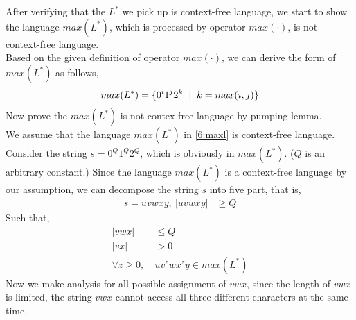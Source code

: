 \documentclass[11pt,a4paper]{article}
\newcommand{\htab}{\hspace*{0.63cm}}
\newcommand{\ba}{\hspace*{0.2cm} | \hspace*{0.2cm}}
\newcommand{\LL}{L^{*}}
\begin{document}
\htab After verifying that the $\LL$ we pick up is context-free language, we start to
show the language $max(\LL)$, which is processed by operator $max(\cdot)$,
is not context-free language. \\
\htab Based on the given definition of operator $max(\cdot)$, we can derive 
the form of $max(\LL)$ as follows,
\begin{align}
    max(\LL) = \{ 0^{i}1^{j}2^{k} \ba k = max(i,j) \} \label{6:maxl}
    \end{align}
\htab Now prove the $max(\LL)$ is not contex-free language by pumping lemma. \\
\htab We assume that the language $max(\LL)$ in \eqref{6:maxl} is context-free language.\\
\htab Consider the string $s = 0^{Q} 1^{Q} 2 ^{Q}$, which is obviously in $max(\LL)$. 
($Q$ is an arbitrary constant.)
Since the language $max(\LL)$ is a context-free language by our assumption, we can
decompose the string $s$ into five part, that is,
\begin{align}
     s = uvwxy ,\ | uvwxy | &\geq Q
    \end{align}
\htab Such that,
\begin{align}
    | vwx | &\leq Q\\
    | vx | &> 0 \\
    \forall z \geq 0,\ & uv^{z}wx^{z}y \in max(\LL) \label{6:ppl}
    \end{align}
\htab Now we make analysis for all possible assignment of $vwx$, since the length of $vwx$ is limited, the string $vwx$ cannot access all three different characters at the same time.
\end{document}
